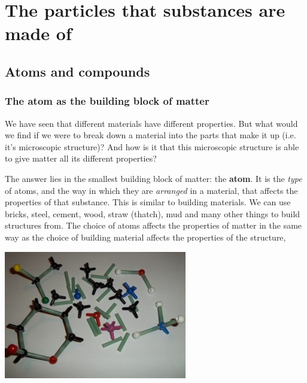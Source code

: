 \chapter{The particles that substances are made of}
\label{chap:composition}
    \setcounter{figure}{1}
    \setcounter{subfigure}{1}
    \label{m38120}
\section{Atoms and compounds}
\subsection*{The atom as the building block of matter}
            \nopagebreak
\label{m38120*id307092}We have seen that different materials have different properties. But what would we find if we were to break down a material into the parts that make it up (i.e.\@{} it's microscopic structure)? And how is it that this microscopic structure is able to give matter all its different properties?\par 
{}
\begin{minipage}{.6\textwidth}
\label{m38120*id307099}The answer lies in the smallest building block of  matter: the \textbf{atom}. It is the \textsl{type} of atoms, and the way in which they are \textsl{arranged} in a material, that affects the properties of that substance. This is similar to building materials. We can use bricks, steel, cement, wood, straw (thatch), mud and many other things to build structures from. The choice of atoms affects the properties of matter in the same way as the choice of building material affects the properties of the structure, \par 
\end{minipage}
\begin{minipage}{.4\textwidth}
 \begin{center}
\includegraphics[width=0.6\textwidth]{photos/atom_model_kit.jpg}
 \end{center}
\end{minipage}

